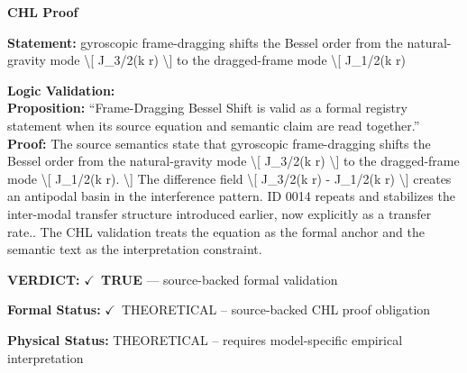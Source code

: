 \vspace{0.45em}
\noindent\textbf{CHL Proof}\par
\textbf{Statement:} gyroscopic frame-dragging shifts the Bessel order from the natural-gravity mode \textbackslash{}[
J\_3/2(k r) \textbackslash{}] to the dragged-frame mode \textbackslash{}[ J\_1/2(k r)

\textbf{Logic Validation:}\\
\textbf{Proposition:} ``Frame-Dragging Bessel Shift is valid as a formal registry statement when its source
equation and semantic claim are read together.''\\
\textbf{Proof:} The source semantics state that gyroscopic frame-dragging shifts the Bessel order from
the natural-gravity mode \textbackslash{}[ J\_3/2(k r) \textbackslash{}] to the dragged-frame mode \textbackslash{}[ J\_1/2(k r). \textbackslash{}]
The difference field \textbackslash{}[ J\_3/2(k r) - J\_1/2(k r) \textbackslash{}] creates an antipodal basin in the
interference pattern. ID 0014 repeats and stabilizes the inter-modal transfer structure
introduced earlier, now explicitly as a transfer rate.. The CHL validation treats the
equation as the formal anchor and the semantic text as the interpretation constraint.

\textbf{VERDICT:} \ensuremath{\checkmark}\ \textbf{TRUE} --- source-backed formal validation

\textbf{Formal Status:} \ensuremath{\checkmark}\ THEORETICAL -- source-backed CHL proof obligation

\textbf{Physical Status:} THEORETICAL -- requires model-specific empirical interpretation
\par\vspace{0.45em}
\par
\ifTZPDarkEdition
{}
\fi
\endgroup
\endgroup
